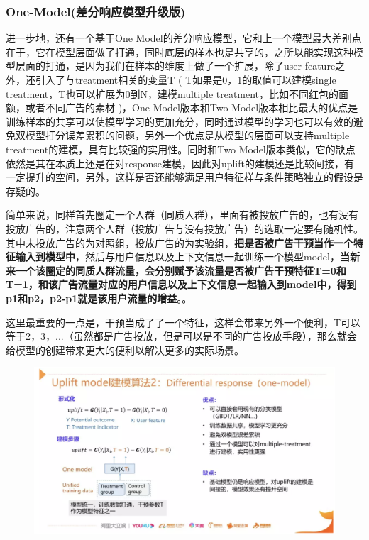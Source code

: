 \documentclass[12pt]{article}
\begin{document}
\subsubsection{One-Model(差分响应模型升级版)}
进一步地，还有一个基于One Model的差分响应模型，它和上一个模型最大差别点在于，它在模型层面做了打通，同时底层的样本也是共享的，之所以能实现这种模型层面的打通，是因为我们在样本的维度上做了一个扩展，除了user feature之外，还引入了与treatment相关的变量T ( T如果是0，1的取值可以建模single treatment，T也可以扩展为0到N，建模multiple treatment，比如不同红包的面额，或者不同广告的素材 )，One Model版本和Two Model版本相比最大的优点是训练样本的共享可以使模型学习的更加充分，同时通过模型的学习也可以有效的避免双模型打分误差累积的问题，另外一个优点是从模型的层面可以支持multiple treatment的建模，具有比较强的实用性。同时和Two Model版本类似，它的缺点依然是其在本质上还是在对response建模，因此对uplift的建模还是比较间接，有一定提升的空间，另外，这样是否还能够满足用户特征样与条件策略独立的假设是存疑的。

简单来说，同样首先圈定一个人群（同质人群），里面有被投放广告的，也有没有投放广告的，注意两个人群（投放广告与没有投放广告）的选取一定要有随机性。其中未投放广告的为对照组，投放广告的为实验组，\textbf{把是否被广告干预当作一个特征输入到模型中}，然后与用户信息以及上下文信息一起训练一个模型model，\textbf{当新来一个该圈定的同质人群流量，会分别赋予该流量是否被广告干预特征T=0和T=1，和该广告流量对应的用户信息以及上下文信息一起输入到model中，得到p1和p2，p2-p1就是该用户流量的增益}。\cite{Understand_Uplift_Model_In_Ads}。

这里最重要的一点是，干预当成了了一个特征，这样会带来另外一个便利，T可以等于2，3，...（虽然都是广告投放，但是可以是不同的广告投放手段），那么就会给模型的创建带来更大的便利以解决更多的实际场景。

\begin{figure}[H]
    \centering
    \includegraphics[width=1\textwidth]{fig/CasualInference-Uplift-Model-One-Model.png}
\end{figure}
\end{document}
